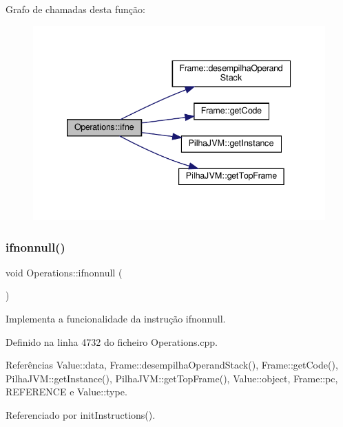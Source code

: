 Grafo de chamadas desta função\+:\nopagebreak
\begin{figure}[H]
\begin{center}
\leavevmode
\includegraphics[width=339pt]{classOperations_aaadc2a6aaf1d3be06e918930622dad29_cgraph}
\end{center}
\end{figure}
\mbox{\label{classOperations_a00af7ab198690f5d3e6c7f2b2d374194}} 
\subsubsection{\texorpdfstring{ifnonnull()}{ifnonnull()}}
{\footnotesize\ttfamily void Operations\+::ifnonnull (\begin{DoxyParamCaption}{ }\end{DoxyParamCaption})\hspace{0.3cm}{\ttfamily [private]}}



Implementa a funcionalidade da instrução ifnonnull. 



Definido na linha 4732 do ficheiro Operations.\+cpp.



Referências Value\+::data, Frame\+::desempilha\+Operand\+Stack(), Frame\+::get\+Code(), Pilha\+J\+V\+M\+::get\+Instance(), Pilha\+J\+V\+M\+::get\+Top\+Frame(), Value\+::object, Frame\+::pc, R\+E\+F\+E\+R\+E\+N\+CE e Value\+::type.



Referenciado por init\+Instructions().

